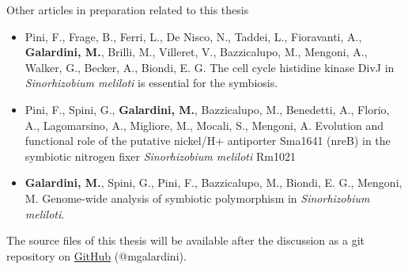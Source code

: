 Other articles in preparation related to this thesis

\begin{itemize}
\item Pini, F., Frage, B., Ferri, L., De Nisco, N., Taddei, L., Fioravanti, A., \textbf{Galardini, M.}, Brilli, M., Villeret, V., Bazzicalupo, M., Mengoni, A., Walker, G., Becker, A., Biondi, E. G. The cell cycle histidine kinase DivJ in \textit{Sinorhizobium meliloti} is essential for the symbiosis.
\item Pini, F., Spini, G., \textbf{Galardini, M.}, Bazzicalupo, M., Benedetti, A., Florio, A., Lagomarsino, A., Migliore, M., Mocali, S., Mengoni, A. Evolution and functional role of the putative nickel/H+ antiporter Sma1641 (nreB) in the symbiotic nitrogen fixer \textit{Sinorhizobium meliloti} Rm1021
\item \textbf{Galardini, M.}, Spini, G., Pini, F., Bazzicalupo, M., Biondi, E. G., Mengoni, M. Genome-wide analysis of symbiotic polymorphism in \textit{Sinorhizobium meliloti}.
\end{itemize}

The source files of this thesis will be available after the discussion as a git repository on \href{https://github.com/mgalardini/PhDGala}{GitHub} (@mgalardini).
